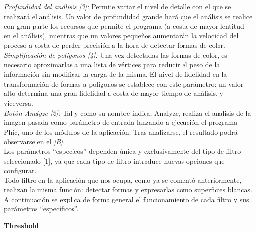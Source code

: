 		\noindent\textit{Profundidad del análisis [3]:} Permite variar el nivel de detalle con el que se realizará el análisis. Un valor de profundidad grande hará que el análisis se realice con gran parte los recursos que permite el programa (a costa de mayor lentitud en el análisis), mientras que un valores pequeños aumentarán la velocidad del proceso a costa de perder precisión a la hora de detectar formas de color.\\
		
		\noindent\textit{Simplificación de polígonos [4]:} Una vez detectadas las formas de color, es necesario aproximarlas a una lista de vértices para reducir el peso de la información sin modificar la carga de la misma. El nivel de fidelidad en la transformación de formas a polígonos se establece con este parámetro: un valor alto determina una gran fidelidad a costa de mayor tiempo de análisis, y viceversa.\\
		
		\noindent\textit{Botón Analyze [2]:} Tal y como su nombre indica, Analyze, realiza el analisis de la imagen pasada como parámetro de entrada lanzando a ejecución el programa Phic, uno de los módulos de la aplicación. Tras analizarse, el resultado podrá observarse en el \textit{[B]}.\\


		Los parámetros ``especícos'' dependen única y exclusivamente del tipo de filtro seleccionado [1], ya que cada tipo de filtro introduce nuevas opciones que configurar. \\
		
		
		Todo filtro en la aplicación que nos ocupa, como ya se comentó anteriormente, realizan la misma función: detectar formas y expresarlas como superficies blancas. A continuación se explica de forma general el funcionamiento de cada filtro y sus parámetros ``específicos''.\\
		
		
		
	\noindent\textbf{Threshold}\\
		
